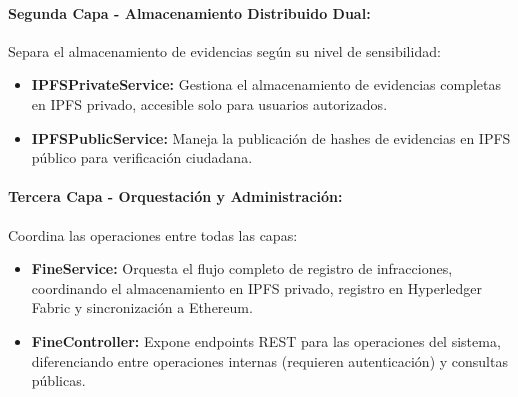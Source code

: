 \paragraph{Segunda Capa - Almacenamiento Distribuido Dual:}
Separa el almacenamiento de evidencias según su nivel de sensibilidad:
\begin{itemize}
    \item \textbf{IPFSPrivateService:} Gestiona el almacenamiento de evidencias completas en IPFS privado, accesible solo para usuarios autorizados.
    \item \textbf{IPFSPublicService:} Maneja la publicación de hashes de evidencias en IPFS público para verificación ciudadana.
\end{itemize}

\paragraph{Tercera Capa - Orquestación y Administración:}
Coordina las operaciones entre todas las capas:
\begin{itemize}
    \item \textbf{FineService:} Orquesta el flujo completo de registro de infracciones, coordinando el almacenamiento en IPFS privado, registro en Hyperledger Fabric y sincronización a Ethereum.
    \item \textbf{FineController:} Expone endpoints REST para las operaciones del sistema, diferenciando entre operaciones internas (requieren autenticación) y consultas públicas.
\end{itemize} 
